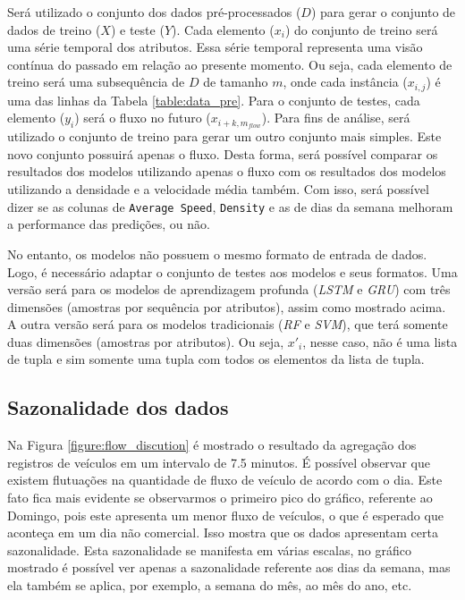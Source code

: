 Será utilizado o conjunto dos dados pré-processados (\(D\)) para gerar o conjunto de dados de treino (\(X\)) e teste (\(Y\)). Cada elemento (\(x_i\)) do conjunto de treino  será uma série temporal dos atributos. Essa série temporal representa uma visão contínua do passado em relação ao presente momento. Ou seja, cada elemento de treino será uma subsequência de \(D\) de tamanho \(m\), onde cada instância (\(x_{i, j}\)) é uma das linhas da Tabela \ref{table:data_pre}. Para o conjunto de testes, cada elemento (\(y_i\)) será o fluxo no futuro (\(x_{i + k, m_{flow}}\)). Para fins de análise, será utilizado o conjunto de treino para gerar um outro conjunto mais simples. Este novo conjunto possuirá apenas o fluxo. Desta forma, será possível comparar os resultados dos modelos utilizando apenas o fluxo com os resultados dos modelos utilizando a densidade e a velocidade média também. Com isso, será possível dizer se as colunas de \texttt{Average Speed}, \texttt{Density} e as de dias da semana melhoram a performance das predições, ou não. 

No entanto, os modelos não possuem o mesmo formato de entrada de dados. Logo, é necessário adaptar o conjunto de testes aos modelos e seus formatos. Uma versão será para os modelos de aprendizagem profunda (\textit{\acrshort{LSTM}} e \textit{\acrshort{GRU}}) com três dimensões (amostras por sequência por atributos), assim como mostrado acima. A outra versão será para os modelos tradicionais (\textit{\acrshort{RF}} e \textit{\acrshort{SVM}}), que terá somente duas dimensões (amostras por atributos). Ou seja, \(x'_i\), nesse caso, não é uma lista de tupla e sim somente uma tupla com todos os elementos da lista de tupla.

\subsection{Sazonalidade dos dados}

Na Figura \ref{figure:flow_discution} é mostrado o resultado da agregação dos registros de veículos em um intervalo de 7.5 minutos. É possível observar que existem flutuações na quantidade de fluxo de veículo de acordo com o dia. Este fato fica mais evidente se observarmos o primeiro pico do gráfico, referente ao Domingo, pois este apresenta um menor fluxo de veículos, o que é esperado que aconteça em um dia não comercial. Isso mostra que os dados apresentam certa sazonalidade. Esta sazonalidade se manifesta em várias escalas, no gráfico mostrado é possível ver apenas a sazonalidade referente aos dias da semana, mas ela também se aplica, por exemplo, a semana do mês, ao mês do ano, etc. 


